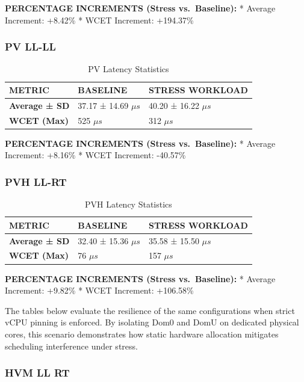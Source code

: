 \textbf{PERCENTAGE INCREMENTS (Stress vs.~Baseline):} * Average
Increment: +8.42\% * WCET Increment: +194.37\%

\subsubsection{PV LL-LL}\label{pv-ll-ll}

\begin{table}
\centering
\caption{PV Latency Statistics}
\begin{tabularx}{\linewidth}{@{}YYY@{}}
\toprule
METRIC & BASELINE & STRESS WORKLOAD\tabularnewline
\midrule
\textbf{Average ± SD} & 37.17 ± 14.69 $\mu s$ & 40.20 ± 16.22 $\mu s$\tabularnewline
\textbf{WCET (Max)} & 525 $\mu s$ & 312 $\mu s$\tabularnewline
\bottomrule
\end{tabularx}
\end{table}

\textbf{PERCENTAGE INCREMENTS (Stress vs.~Baseline):} * Average
Increment: +8.16\% * WCET Increment: -40.57\%

\subsubsection{PVH LL-RT}\label{pvh-ll-rt}

\begin{table}
\centering
\caption{PVH Latency Statistics}
\begin{tabularx}{\linewidth}{@{}YYY@{}}
\toprule
METRIC & BASELINE & STRESS WORKLOAD\tabularnewline
\midrule
\textbf{Average ± SD} & 32.40 ± 15.36 $\mu s$ & 35.58 ± 15.50 $\mu s$\tabularnewline
\textbf{WCET (Max)} & 76 $\mu s$ & 157 $\mu s$\tabularnewline
\bottomrule
\end{tabularx}
\end{table}

\textbf{PERCENTAGE INCREMENTS (Stress vs.~Baseline):} * Average
Increment: +9.82\% * WCET Increment: +106.58\%


The tables below evaluate the resilience of the same configurations when
strict vCPU pinning is enforced. By isolating Dom0 and DomU on dedicated
physical cores, this scenario demonstrates how static hardware
allocation mitigates scheduling interference under stress.

\subsubsection{HVM LL RT}\label{hvm-ll-rt}

